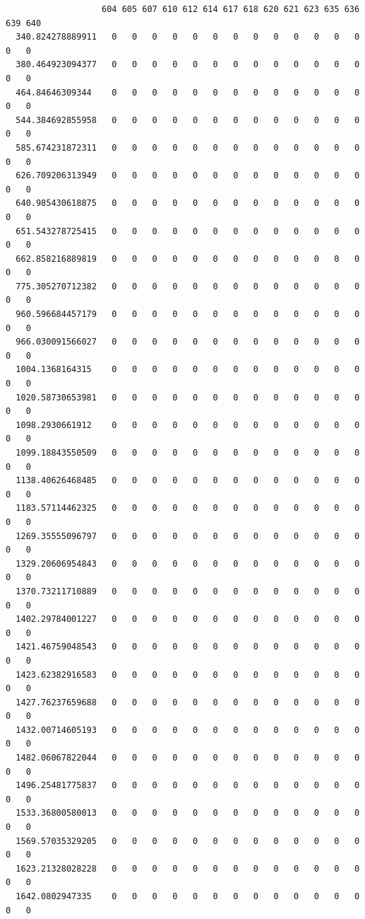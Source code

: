 \documentclass[
  letterpaper,
  DIV=11,
  numbers=noendperiod]{scrartcl}
\begin{document}
\begin{verbatim}
                   604 605 607 610 612 614 617 618 620 621 623 635 636 639 640
  340.824278889911   0   0   0   0   0   0   0   0   0   0   0   0   0   0   0
  380.464923094377   0   0   0   0   0   0   0   0   0   0   0   0   0   0   0
  464.84646309344    0   0   0   0   0   0   0   0   0   0   0   0   0   0   0
  544.384692855958   0   0   0   0   0   0   0   0   0   0   0   0   0   0   0
  585.674231872311   0   0   0   0   0   0   0   0   0   0   0   0   0   0   0
  626.709206313949   0   0   0   0   0   0   0   0   0   0   0   0   0   0   0
  640.985430618875   0   0   0   0   0   0   0   0   0   0   0   0   0   0   0
  651.543278725415   0   0   0   0   0   0   0   0   0   0   0   0   0   0   0
  662.858216889819   0   0   0   0   0   0   0   0   0   0   0   0   0   0   0
  775.305270712382   0   0   0   0   0   0   0   0   0   0   0   0   0   0   0
  960.596684457179   0   0   0   0   0   0   0   0   0   0   0   0   0   0   0
  966.030091566027   0   0   0   0   0   0   0   0   0   0   0   0   0   0   0
  1004.1368164315    0   0   0   0   0   0   0   0   0   0   0   0   0   0   0
  1020.58730653981   0   0   0   0   0   0   0   0   0   0   0   0   0   0   0
  1098.2930661912    0   0   0   0   0   0   0   0   0   0   0   0   0   0   0
  1099.18843550509   0   0   0   0   0   0   0   0   0   0   0   0   0   0   0
  1138.40626468485   0   0   0   0   0   0   0   0   0   0   0   0   0   0   0
  1183.57114462325   0   0   0   0   0   0   0   0   0   0   0   0   0   0   0
  1269.35555096797   0   0   0   0   0   0   0   0   0   0   0   0   0   0   0
  1329.20606954843   0   0   0   0   0   0   0   0   0   0   0   0   0   0   0
  1370.73211710889   0   0   0   0   0   0   0   0   0   0   0   0   0   0   0
  1402.29784001227   0   0   0   0   0   0   0   0   0   0   0   0   0   0   0
  1421.46759048543   0   0   0   0   0   0   0   0   0   0   0   0   0   0   0
  1423.62382916583   0   0   0   0   0   0   0   0   0   0   0   0   0   0   0
  1427.76237659688   0   0   0   0   0   0   0   0   0   0   0   0   0   0   0
  1432.00714605193   0   0   0   0   0   0   0   0   0   0   0   0   0   0   0
  1482.06067822044   0   0   0   0   0   0   0   0   0   0   0   0   0   0   0
  1496.25481775837   0   0   0   0   0   0   0   0   0   0   0   0   0   0   0
  1533.36800580013   0   0   0   0   0   0   0   0   0   0   0   0   0   0   0
  1569.57035329205   0   0   0   0   0   0   0   0   0   0   0   0   0   0   0
  1623.21328028228   0   0   0   0   0   0   0   0   0   0   0   0   0   0   0
  1642.0802947335    0   0   0   0   0   0   0   0   0   0   0   0   0   0   0

\end{verbatim}
\end{document}
